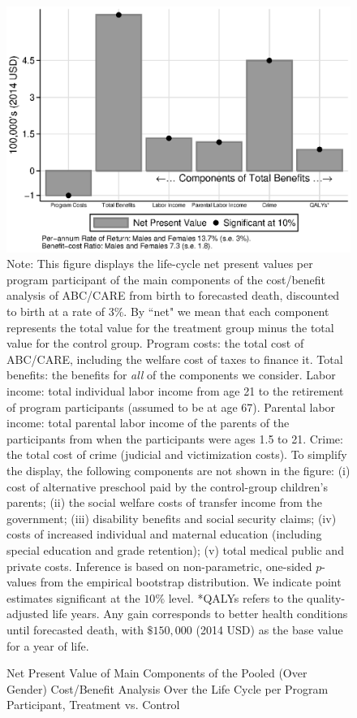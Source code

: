 \begin{figure}
\caption{Net Present Value of Main Components of the Pooled (Over Gender) Cost/Benefit Analysis Over the Life Cycle per Program Participant, Treatment vs. Control}\label{figure:main}
\centering
\includegraphics[width=.7\columnwidth]{output/abccare_npvssummredux.eps}
\footnotesize \justify
Note: This figure displays the life-cycle net present values per program participant of the main components of the cost/benefit analysis of ABC/CARE from birth to forecasted death, discounted to birth at a rate of 3\%. By ``net" we mean that each component represents the total value for the treatment group minus the total value for the control group. Program costs: the total cost of ABC/CARE, including the welfare cost of taxes to finance it. Total benefits: the benefits for \textit{all} of the components we consider. Labor income: total individual labor income from age 21 to the retirement of program participants (assumed to be at age 67). Parental labor income: total parental labor income of the parents of the participants from when the participants were ages 1.5 to 21. Crime: the total cost of crime (judicial and victimization costs). To simplify the display, the following components are not shown in the figure: (i) cost of alternative preschool paid by the control-group children's parents; (ii) the social welfare costs of transfer income from the government; (iii) disability benefits and social security claims; (iv) costs of increased individual and maternal education (including special education and grade retention); (v) total medical public and private costs. Inference is based on non-parametric, one-sided $p$-values from the empirical bootstrap distribution. We indicate point estimates significant at the $10\%$ level.
*QALYs refers to the quality-adjusted life years. Any gain corresponds to better health conditions until forecasted death, with $\$150,000$ (2014 USD) as the base value for a year of life.
\end{figure}


